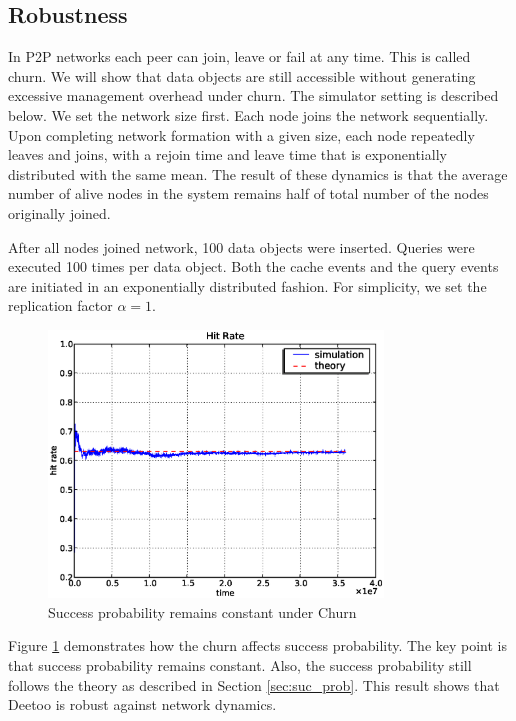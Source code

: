\documentclass[9.5pt,journal,final,finalsubmission,twocolumn]{IEEEtran}
\begin{document}
\subsection{Robustness}
In P2P networks each peer can join, leave or fail 
at any time.  This is called churn.
We will show that data objects are still accessible without generating 
excessive management overhead under churn.
The simulator setting is described below.
We set the network size first. Each node joins the network sequentially.
Upon completing network formation with a given size, each node repeatedly 
leaves and joins, with a rejoin time and leave time that is exponentially
distributed with the same mean. 
The result of these dynamics is that the average number of 
alive nodes in the system remains half of total number of the nodes 
originally joined. 

After all nodes joined network, 100 data objects were inserted.
Queries were executed 100 times per data object. 
Both the cache events and the query events are initiated  
in an exponentially distributed fashion.
For simplicity, we set the replication factor $\alpha=1$.

\begin{figure}
\centering
\includegraphics[width=3.5in]{hit_ch}
\caption{Success probability remains constant under Churn} \label{fig:hit_churn}
\end{figure}
Figure \ref{fig:hit_churn} demonstrates how the churn affects success probability.
The key point is that success probability remains constant. 
Also, the success probability still follows the theory as described in Section \ref{sec:suc_prob}.
This result shows that Deetoo is robust against network dynamics. 
\end{document}
